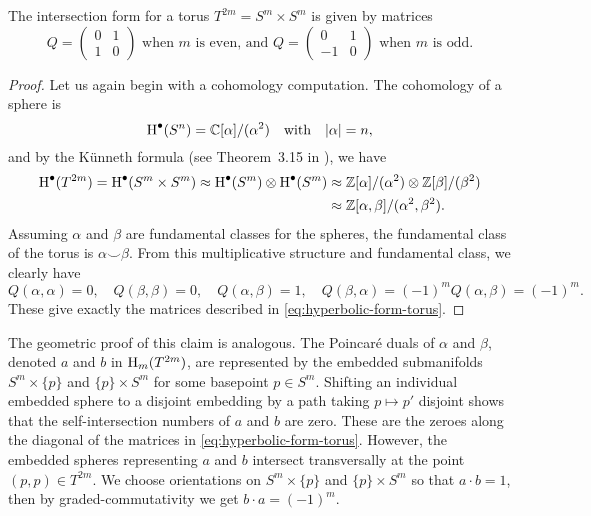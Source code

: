 \begin{figure}[ht]
	\centering
	\caption{}
\end{figure}

\begin{proposition}\label{prop:intersection-form-torus}
	The intersection form for a torus $T^{2m}=S^m\times S^m$ is given by matrices
	\begin{equation}\label{eq:hyperbolic-form-torus}
		Q = \begin{pmatrix}0 & 1 \\ 1 & 0\end{pmatrix}
		\textrm{ when }m\textrm{ is even, and } 
		Q = \begin{pmatrix}0 & 1 \\ -1 & 0\end{pmatrix}
		\textrm{ when }m\textrm{ is odd.} 
	\end{equation}
\end{proposition}
\begin{proof}
	Let us again begin with a cohomology computation. The cohomology of a sphere is 
	\begin{equation}
		\operatorname{H}^\bullet(S^n) = \mathbb{C}[\alpha]/(\alpha^2)\quad\textrm{with}\quad |\alpha| = n,
	\end{equation}
	and by the K\"unneth formula (see Theorem~3.15 in \cite{hatcher2002topology}), we have
	\begin{equation}
		\begin{aligned}
			\operatorname{H}^\bullet(T^{2m})=\operatorname{H}^\bullet(S^m\times S^m)\approx \operatorname{H}^\bullet(S^m)\otimes \operatorname{H}^\bullet(S^m) 
			&\approx \mathbb{Z}[\alpha]/(\alpha^2)\otimes \mathbb{Z}[\beta]/(\beta^2)\\
			&\approx \mathbb{Z}[\alpha,\beta]/(\alpha^2,\beta^2).
		\end{aligned}
	\end{equation}
	Assuming $\alpha$ and $\beta$ are fundamental classes for the spheres, the fundamental class of the torus is $\alpha\smile \beta$. From this multiplicative structure and fundamental class, we clearly have
	\begin{equation}
			Q(\alpha, \alpha)=0, \quad Q(\beta,\beta)=0, \quad Q(\alpha,\beta)=1,\quad Q(\beta,\alpha)=(-1)^m Q(\alpha,\beta)=(-1)^m.
	\end{equation}
	These give exactly the matrices described in \cref{eq:hyperbolic-form-torus}.
\end{proof}

The geometric proof of this claim is analogous. The Poincar\'e duals of $\alpha$ and $\beta$, denoted $a$ and $b$ in $\operatorname{H}_{m}(T^{2m})$, are represented 
by the embedded submanifolds $S^m\times \{p\}$ and $\{p\}\times S^m$ for some basepoint $p\in S^m$. Shifting an individual embedded sphere to a disjoint embedding by a path taking $p\mapsto p'$ disjoint shows that the self-intersection numbers of $a$ and $b$ are zero. These are the zeroes along the diagonal of the matrices in \cref{eq:hyperbolic-form-torus}. However, the embedded spheres representing $a$ and $b$ intersect transversally at the point $(p,p)\in T^{2m}$. We choose orientations on $S^m\times \{p\}$ and $\{p\}\times S^m$ so that $a\cdot b=1$, then by graded-commutativity we get $b\cdot a=(-1)^m$.

